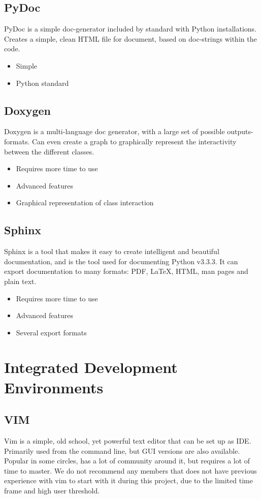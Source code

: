 \documentclass{report}
\begin{document}
\subsection{PyDoc}
PyDoc  is  a  simple  doc-generator  included  by  standard  with  Python  installations\cite{website:pydoc}. Creates  a simple, clean HTML file for document, based on doc-strings within the code. 
\begin{itemize}
\item Simple
\item Python standard
\end{itemize}

\subsection{Doxygen}
Doxygen is a multi-language doc generator, with a large set of possible outputs-formats\cite{website:doxygen}. Can even create a graph to graphically represent the interactivity between the different classes. 
\begin{itemize}
\item Requires more time to use
\item Advanced features
\item Graphical representation of class interaction
\end{itemize}
\subsection{Sphinx}
Sphinx\cite{website:sphinx} is a tool that makes it easy to create intelligent and beautiful documentation, and is the tool used for documenting Python v3.3.3. It can export documentation to many formats: PDF, LaTeX, HTML, man pages and plain text. 

\begin{itemize}
\item Requires more time to use
\item Advanced features
\item Several export formats
\end{itemize}
\newpage
\section{Integrated Development Environments}

\subsection{VIM}
Vim\cite{website:vim} is a simple, old school, yet powerful text editor that can be set up as IDE. Primarily used from the command line, but GUI versions are also available. Popular in some circles, has a lot of community around it, but requires a lot of time to master. We do not recommend any members that does not have previous experience with vim to start with it during this project, due to the limited time frame and high user threshold.
\end{document}
